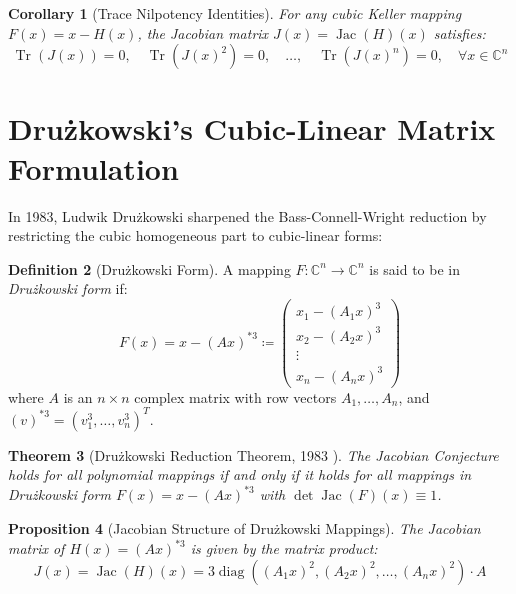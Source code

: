 \documentclass[11pt,a4paper]{article}
\newtheorem{theorem}{Theorem}[section]
\newtheorem{proposition}[theorem]{Proposition}
\newtheorem{corollary}[theorem]{Corollary}
\theoremstyle{definition}
\newtheorem{definition}[theorem]{Definition}
\begin{document}
\begin{corollary}[Trace Nilpotency Identities]\label{cor:traces}
For any cubic Keller mapping $F(x) = x - H(x)$, the Jacobian matrix $J(x) = \operatorname{Jac}(H)(x)$ satisfies:
\begin{equation}\label{eq:trace_nilpotent}
\operatorname{Tr}(J(x)) = 0, \quad \operatorname{Tr}(J(x)^2) = 0, \quad \dots, \quad \operatorname{Tr}(J(x)^n) = 0, \quad \forall x \in \mathbb{C}^n
\end{equation}
\end{corollary}

\section{Drużkowski's Cubic-Linear Matrix Formulation}

In 1983, Ludwik Drużkowski \cite{druzkowski1983} sharpened the Bass-Connell-Wright reduction by restricting the cubic homogeneous part to cubic-linear forms:

\begin{definition}[Drużkowski Form]\label{def:druzkowski_form}
A mapping $F: \mathbb{C}^n \to \mathbb{C}^n$ is said to be in \emph{Drużkowski form} if:
\begin{equation}\label{eq:druzkowski_def}
F(x) = x - (Ax)^{*3} \coloneqq \begin{pmatrix} x_1 - (A_1 x)^3 \\ x_2 - (A_2 x)^3 \\ \vdots \\ x_n - (A_n x)^3 \end{pmatrix}
\end{equation}
where $A$ is an $n \times n$ complex matrix with row vectors $A_1, \dots, A_n$, and $(v)^{*3} = (v_1^3, \dots, v_n^3)^T$.
\end{definition}

\begin{theorem}[Drużkowski Reduction Theorem, 1983 \cite{druzkowski1983}]\label{thm:druzkowski_reduction}
The Jacobian Conjecture holds for all polynomial mappings if and only if it holds for all mappings in Drużkowski form $F(x) = x - (Ax)^{*3}$ with $\det \operatorname{Jac}(F)(x) \equiv 1$.
\end{theorem}

\begin{proposition}[Jacobian Structure of Drużkowski Mappings]\label{prop:druzkowski_jac}
The Jacobian matrix of $H(x) = (Ax)^{*3}$ is given by the matrix product:
\begin{equation}\label{eq:druzkowski_jac_product}
J(x) = \operatorname{Jac}(H)(x) = 3 \operatorname{diag}((A_1 x)^2, (A_2 x)^2, \dots, (A_n x)^2) \cdot A
\end{equation}
\end{proposition}
\end{document}
